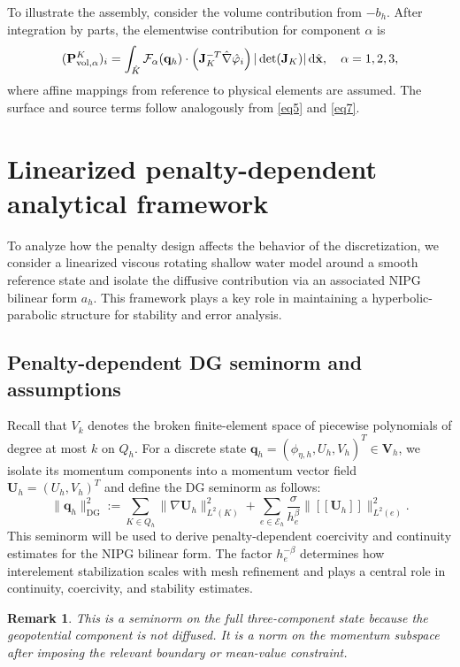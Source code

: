 \documentclass[pdflatex,sn-mathphys-num]{sn-jnl}%
\theoremstyle{thmstyleone}%
\theoremstyle{thmstyletwo}%
\newtheorem{remark}{Remark}%
\theoremstyle{thmstylethree}%
\begin{document}
To illustrate the assembly, consider the volume contribution from $-b_h$. After integration by parts, the elementwise contribution for component $\alpha$ is
\begin{equation}\notag
(\mathbf{P}_{\mathrm{vol},\alpha}^K)_i
=
\int_{\hat{K}}
\mathcal{F}_\alpha(\mathbf{q}_h)\cdot
\left(\mathbf{J}_K^{-T}\hat{\nabla}\hat{\varphi}_i\right)
|\det(\mathbf{J}_K)|
\,\mathrm{d}\hat{\mathbf{x}},
\quad \alpha=1,2,3,
\end{equation}
where affine mappings from reference to physical elements are assumed. The surface and source terms follow analogously from \eqref{eq5} and \eqref{eq7}.


\section{Linearized penalty-dependent analytical framework}
\label{sec:analysis}

To analyze how the penalty design affects the behavior of the discretization, we consider a linearized viscous rotating shallow water model around a smooth reference state and isolate the diffusive contribution via an associated NIPG bilinear form $a_h$. This framework plays a key role in maintaining a hyperbolic-parabolic structure for stability and error analysis.

\subsection{Penalty-dependent DG seminorm and assumptions}

Recall that $V_k$ denotes the broken finite-element space of piecewise polynomials of degree at most $k$ on $Q_h$. 
For a discrete state $\mathbf{q}_h=(\phi_{\eta,h}, U_h, V_h)^T \in \mathbf V_h$, we isolate its momentum components into a momentum vector field
$\mathbf{U}_h = (U_h, V_h)^T$ and define the DG seminorm as follows:
\begin{equation}
\label{eq11}
\|\mathbf{q}_h\|_{\mathrm{DG}}^2
:=
\sum_{K\in Q_h}\|\nabla \mathbf{U}_h\|_{L^2(K)}^2
+
\sum_{e\in\mathcal{E}_h}
\frac{\sigma}{h_e^\beta}
\|[[\mathbf{U}_h ]]\|_{L^2(e)}^2.
\end{equation}
This seminorm will be used to derive penalty-dependent coercivity and continuity estimates for the NIPG bilinear form. The factor $h_e^{-\beta}$ determines how interelement stabilization scales with mesh refinement and plays a central role in continuity, coercivity, and stability estimates.
\begin{remark}
This is a seminorm on the full three-component state because the geopotential component is not diffused. It is a norm on the momentum subspace after imposing the relevant boundary or mean-value constraint.
\end{remark}
\end{document}
